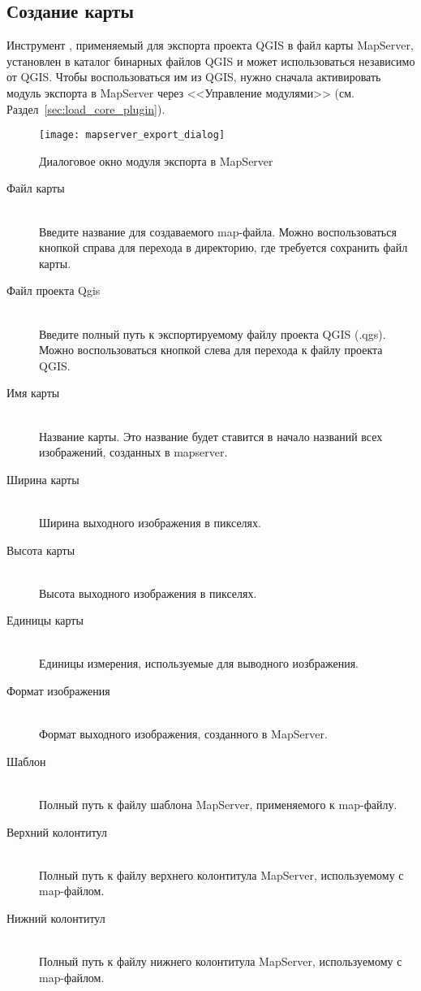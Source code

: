 \subsection{Создание карты}

Инструмент , применяемый для экспорта проекта QGIS
в файл карты MapServer, установлен в каталог бинарных файлов QGIS и
может использоваться независимо от QGIS. Чтобы воспользоваться им из
QGIS, нужно сначала активировать модуль экспорта в MapServer через
<<Управление модулями>> (см. Раздел~\ref{sec:load_core_plugin}).

\begin{figure}[ht]
\centering
  \texttt{[image: mapserver\_export\_dialog]}
  \caption{Диалоговое окно модуля экспорта в MapServer \wincaption}
  \label{fig:mapserver_export_dialog}
\end{figure}

\begin{description}
\item [Файл карты] \mbox{}\\
Введите название для создаваемого map-файла. Можно воспользоваться
кнопкой справа для перехода в директорию, где требуется сохранить файл
карты.
\item [Файл проекта Qgis] \mbox{}\\
Введите полный путь к экспортируемому файлу проекта QGIS (.qgs). Можно
воспользоваться кнопкой слева для перехода к файлу проекта QGIS.
\item [Имя карты] \mbox{}\\
Название карты. Это название будет ставится в начало названий всех
изображений, созданных в mapserver.
\item [Ширина карты] \mbox{}\\
Ширина выходного изображения в пикселях.
\item [Высота карты] \mbox{}\\
Высота выходного изображения в пикселях.
\item [Единицы карты] \mbox{}\\
Единицы измерения, используемые для выводного иозбражения.
\item [Формат изображения] \mbox{}\\
Формат выходного изображения, созданного в MapServer.
\item [Шаблон] \mbox{}\\
Полный путь к файлу шаблона MapServer, применяемого к map-файлу.
\item [Верхний колонтитул] \mbox{}\\
Полный путь к файлу верхнего колонтитула MapServer, используемому с
map-файлом.
\item [Нижний колонтитул] \mbox{}\\
Полный путь к файлу нижнего колонтитула MapServer, используемому с
map-файлом.
\end{description}

